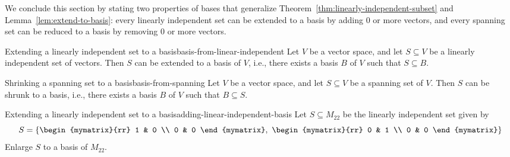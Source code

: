 We conclude this section by stating two properties of bases that
generalize Theorem~\ref{thm:linearly-independent-subset} and
Lemma~\ref{lem:extend-to-basis}: every linearly independent set can be
extended to a basis by adding 0 or more vectors, and every spanning
set can be reduced to a basis by removing 0 or more vectors.

\begin{proposition}{Extending a linearly independent set to a basis}{basis-from-linear-independent}
  Let $V$ be a vector space, and let $S\subseteq V$ be a linearly
  independent set of vectors. Then $S$ can be extended to a basis of
  $V$, i.e., there exists a basis $B$ of $V$ such that $S\subseteq
  B$.%
\end{proposition}

\begin{proposition}{Shrinking a spanning set to a basis}{basis-from-spanning}
  Let $V$ be a vector space, and let $S\subseteq V$ be a spanning set
  of $V$. Then $S$ can be shrunk to a basis, i.e., there exists a
  basis $B$ of $V$ such that $B\subseteq S$.
\end{proposition}

\begin{example}{Extending a linearly independent set to a basis}{adding-linear-independent-basis}
  Let $S \subseteq M_{22}$ be the linearly independent set given by
  \begin{equation*}
    S  = \set{
      \begin{mymatrix}{rr}
        1 & 0 \\
        0 & 0
      \end{mymatrix},~
      \begin{mymatrix}{rr}
        0 & 1 \\
        0 & 0
      \end{mymatrix} }
  \end{equation*}
  Enlarge $S$ to a basis of $M_{22}$.
\end{example}

